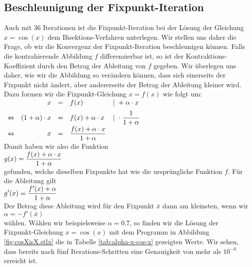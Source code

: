 \subsection{Beschleunigung der Fixpunkt-Iteration}
Auch mit 36 Iterationen ist die Fixpunkt-Iteration bei der L\"osung der Gleichung $x = \cos(x)$
 dem Bisektions-Verfahren unterlegen.
Wir stellen uns daher die Frage, ob wir die Konvergenz der Fixpunkt-Iteration
beschleunigen k\"onnen.  Falls die kontrahierende Abbildung $f$ differenzierbar ist, so ist der
Kontraktions-Koeffizient durch den Betrag der Ableitung von $f$ gegeben.  Wir \"uberlegen uns daher,
wie wir die Abbildung so ver\"andern k\"onnen, dass sich einerseits der Fixpunkt nicht \"andert,
aber andererseits der Betrag der Ableitung kleiner wird.  Dazu formen wir die
Fixpunkt-Gleichung $x = f(x)$ wie folgt um:
\\[0.2cm]
\hspace*{1.3cm}
$
\begin{array}[t]{crcll}
                & x & = & f(x)                                           & \mid\; + \;\alpha \cdot  x            \\[0.2cm]
\Leftrightarrow & \displaystyle (1 + \alpha) \cdot  x & = & f(x) + \alpha \cdot  x & \displaystyle\mid\; \cdot  \;\frac{1}{1 + \alpha} \\[0.2cm]
\Leftrightarrow &                x & = & \displaystyle\frac{f(x) + \alpha \cdot  x}{1 + \alpha}            
\end{array}
$
\\[0.2cm]
Damit haben wir also die Funktion 
\\[0.2cm]
\hspace*{1.3cm}
$g(x) = \displaystyle\frac{f(x) + \alpha \cdot  x}{1 + \alpha}$
\\[0.2cm]
gefunden, welche dieselben Fixpunkte hat wie die urspr\"ungliche Funktion $f$.  F\"ur die
Ableitung gilt 
\\[0.2cm]
\hspace*{1.3cm}
$\displaystyle g'(x) = \frac{f'(x) + \alpha}{1 + \alpha}$
\\[0.2cm]
Der Betrag diese Ableitung wird f\"ur den Fixpunkt $\bar{x}$ dann am kleinsten, wenn wir 
\\[0.2cm]
\hspace*{1.3cm}
$\alpha = - f'(\bar{x})$ 
\\[0.2cm]
w\"ahlen.  W\"ahlen wir beispielsweise $\alpha = 0.7$, so finden wir die L\"osung der
Fixpunkt-Gleichung $x = \cos(x)$ mit dem Programm in Abbildung \ref{fig:cosXisX.stlx}
die in Tabelle \ref{tab:alpha-x-cos-x} gezeigten Werte.  Wir sehen, dass bereits nach f\"unf
Iterations-Schritten eine Genauigkeit von mehr als $10^{-6}$ erreicht ist.

